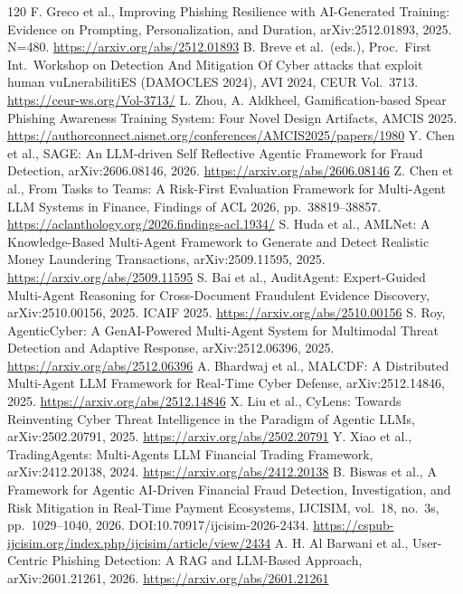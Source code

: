 \documentclass[11pt,a4paper]{article}
\begin{document}
\begin{thebibliography}{120}
 F. Greco et al., Improving Phishing Resilience with AI-Generated Training: Evidence on Prompting, Personalization, and Duration, arXiv:2512.01893, 2025. N=480. \url{https://arxiv.org/abs/2512.01893}
 B. Breve et al.\ (eds.), Proc.\ First Int.\ Workshop on Detection And Mitigation Of Cyber attacks that exploit human vuLnerabilitiES (DAMOCLES 2024), AVI 2024, CEUR Vol.~3713. \url{https://ceur-ws.org/Vol-3713/}
 L. Zhou, A. Aldkheel, Gamification-based Spear Phishing Awareness Training System: Four Novel Design Artifacts, AMCIS 2025. \url{https://authorconnect.aisnet.org/conferences/AMCIS2025/papers/1980}
 Y. Chen et al., SAGE: An LLM-driven Self Reflective Agentic Framework for Fraud Detection, arXiv:2606.08146, 2026. \url{https://arxiv.org/abs/2606.08146}
 Z. Chen et al., From Tasks to Teams: A Risk-First Evaluation Framework for Multi-Agent LLM Systems in Finance, Findings of ACL 2026, pp.~38819--38857. \url{https://aclanthology.org/2026.findings-acl.1934/}
 S. Huda et al., AMLNet: A Knowledge-Based Multi-Agent Framework to Generate and Detect Realistic Money Laundering Transactions, arXiv:2509.11595, 2025. \url{https://arxiv.org/abs/2509.11595}
 S. Bai et al., AuditAgent: Expert-Guided Multi-Agent Reasoning for Cross-Document Fraudulent Evidence Discovery, arXiv:2510.00156, 2025. ICAIF 2025. \url{https://arxiv.org/abs/2510.00156}
 S. Roy, AgenticCyber: A GenAI-Powered Multi-Agent System for Multimodal Threat Detection and Adaptive Response, arXiv:2512.06396, 2025. \url{https://arxiv.org/abs/2512.06396}
 A. Bhardwaj et al., MALCDF: A Distributed Multi-Agent LLM Framework for Real-Time Cyber Defense, arXiv:2512.14846, 2025. \url{https://arxiv.org/abs/2512.14846}
 X. Liu et al., CyLens: Towards Reinventing Cyber Threat Intelligence in the Paradigm of Agentic LLMs, arXiv:2502.20791, 2025. \url{https://arxiv.org/abs/2502.20791}
 Y. Xiao et al., TradingAgents: Multi-Agents LLM Financial Trading Framework, arXiv:2412.20138, 2024. \url{https://arxiv.org/abs/2412.20138}
 B. Biswas et al., A Framework for Agentic AI-Driven Financial Fraud Detection, Investigation, and Risk Mitigation in Real-Time Payment Ecosystems, IJCISIM, vol.~18, no.~3s, pp.~1029--1040, 2026. DOI:10.70917/ijcisim-2026-2434. \url{https://cspub-ijcisim.org/index.php/ijcisim/article/view/2434}
 A. H. Al Barwani et al., User-Centric Phishing Detection: A RAG and LLM-Based Approach, arXiv:2601.21261, 2026. \url{https://arxiv.org/abs/2601.21261}

\end{thebibliography}
\end{document}
